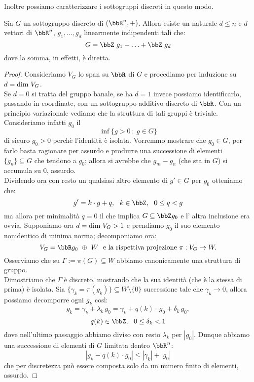 Inoltre possiamo caratterizzare i sottogruppi discreti in questo modo.
\begin{teorema}\label{sgr_discreti}
    Sia $G$ un sottogruppo discreto di $(\bbR^n,+)$. Allora esiste un naturale $d\leq n$ e $d$ vettori di $\bbR^n$, $g_1,\ldots,g_d$ linearmente indipendenti tali che:
$$
G=\bbZ\ g_1+\ldots+\bbZ\ g_d
$$
dove la somma, in effetti, è diretta.
\end{teorema}
\begin{proof}
    Consideriamo $V_G$ lo span su $\bbR$ di $G$ e procediamo per induzione su $d=\mbox{dim } V_G$.\\
    Se $d=0$ si tratta del gruppo banale, se ha $d=1$ invece possiamo identificarlo, passando in coordinate, con un sottogruppo additivo discreto di $\bbR$. Con un principio variazionale vediamo che la struttura di tali gruppi è triviale. Consideriamo infatti $g_0$ il
    $$\inf\{g>0\ :\ g\in G\}$$
    di sicuro $g_0>0$ perchè l'identità è isolata. Vorremmo mostrare che $g_0\in G$, per farlo basta ragionare per assurdo e produrre una successione di elementi $\{g_n\}\subseteq G $ che tendono a $g_0$; allora si avrebbe che $g_m-g_n$ (che sta in $G$) si accumula su $0$, assurdo.\\
    Dividendo ora con resto un qualsiasi altro elemento di $g'\in G$ per $g_0$ otteniamo che:
    $$
    g'=k\cdot g+q,\ \ k\in \bbZ,\ \ 0\leq q <g
    $$
    ma allora per minimalità $q=0$ il che implica $G\subseteq \bbZ g_0$ e l' altra inclusione era ovvia.
    Supponiamo ora $d=\mbox{dim }{V_G}>1$ e prendiamo $g_0$ il suo elemento nonidentico di minima norma; decomponiamo ora:
    $$
    V_G=\bbR g_0\ \oplus\  W\ \mbox{ e la rispettiva projezione}\ \pi:V_G\rightarrow W.
    $$
    Osserviamo che su $\Gamma:=\pi(G)\subseteq W$ abbiamo canonicamente una struttura di gruppo.\\
    Dimostriamo che $\Gamma$ è discreto, mostrando che la sua identità (che è la stessa di prima) è isolata. Sia $\{\gamma_k=\pi(g_k)\}\subseteq W\setminus\{0\}$ successione tale che $\gamma_k\rightarrow 0$, allora possiamo decomporre ogni $g_k$ così:
    $$
    g_k=\gamma_k+\lambda_k\, g_0=\gamma_k+q(k)\cdot\, g_0+\delta_k\, g_0,
    $$
    $$
    q(k)\in\bbZ,\ \ 0\leq \delta_k<1
    $$
    dove nell'ultimo passaggio abbiamo diviso con resto $\lambda_k$ per $|g_0|$. Dunque abbiamo una successione di elementi di $G$ limitata dentro $\bbR^n$:
    $$
    |g_k-q(k)\cdot g_0| \leq |\gamma_k|+|g_0|
    $$
    che per discretezza può essere composta solo da un numero finito di elementi, assurdo.


\end{proof}
